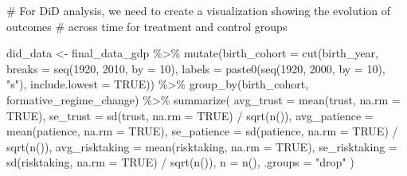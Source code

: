 \documentclass[
  letterpaper,
  DIV=11,
  numbers=noendperiod]{scrartcl}
\newenvironment{Shaded}{\begin{snugshade}}{\end{snugshade}}
\newcommand{\AttributeTok}[1]{\textcolor[rgb]{0.40,0.45,0.13}{#1}}
\newcommand{\CommentTok}[1]{\textcolor[rgb]{0.37,0.37,0.37}{#1}}
\newcommand{\ConstantTok}[1]{\textcolor[rgb]{0.56,0.35,0.01}{#1}}
\newcommand{\DecValTok}[1]{\textcolor[rgb]{0.68,0.00,0.00}{#1}}
\newcommand{\FunctionTok}[1]{\textcolor[rgb]{0.28,0.35,0.67}{#1}}
\newcommand{\NormalTok}[1]{\textcolor[rgb]{0.00,0.23,0.31}{#1}}
\newcommand{\OtherTok}[1]{\textcolor[rgb]{0.00,0.23,0.31}{#1}}
\newcommand{\SpecialCharTok}[1]{\textcolor[rgb]{0.37,0.37,0.37}{#1}}
\newcommand{\StringTok}[1]{\textcolor[rgb]{0.13,0.47,0.30}{#1}}
\begin{document}
\begin{Shaded}
\begin{Highlighting}[]
\CommentTok{\# For DiD analysis, we need to create a visualization showing the evolution of outcomes}
\CommentTok{\# across time for treatment and control groups}

\NormalTok{did\_data }\OtherTok{\textless{}{-}}\NormalTok{ final\_data\_gdp }\SpecialCharTok{\%\textgreater{}\%}
  \FunctionTok{mutate}\NormalTok{(}\AttributeTok{birth\_cohort =} \FunctionTok{cut}\NormalTok{(birth\_year, }
                          \AttributeTok{breaks =} \FunctionTok{seq}\NormalTok{(}\DecValTok{1920}\NormalTok{, }\DecValTok{2010}\NormalTok{, }\AttributeTok{by =} \DecValTok{10}\NormalTok{),}
                          \AttributeTok{labels =} \FunctionTok{paste0}\NormalTok{(}\FunctionTok{seq}\NormalTok{(}\DecValTok{1920}\NormalTok{, }\DecValTok{2000}\NormalTok{, }\AttributeTok{by =} \DecValTok{10}\NormalTok{), }\StringTok{"s"}\NormalTok{),}
                          \AttributeTok{include.lowest =} \ConstantTok{TRUE}\NormalTok{)) }\SpecialCharTok{\%\textgreater{}\%}
  \FunctionTok{group\_by}\NormalTok{(birth\_cohort, formative\_regime\_change) }\SpecialCharTok{\%\textgreater{}\%}
  \FunctionTok{summarize}\NormalTok{(}
    \AttributeTok{avg\_trust =} \FunctionTok{mean}\NormalTok{(trust, }\AttributeTok{na.rm =} \ConstantTok{TRUE}\NormalTok{),}
    \AttributeTok{se\_trust =} \FunctionTok{sd}\NormalTok{(trust, }\AttributeTok{na.rm =} \ConstantTok{TRUE}\NormalTok{) }\SpecialCharTok{/} \FunctionTok{sqrt}\NormalTok{(}\FunctionTok{n}\NormalTok{()),}
    \AttributeTok{avg\_patience =} \FunctionTok{mean}\NormalTok{(patience, }\AttributeTok{na.rm =} \ConstantTok{TRUE}\NormalTok{),}
    \AttributeTok{se\_patience =} \FunctionTok{sd}\NormalTok{(patience, }\AttributeTok{na.rm =} \ConstantTok{TRUE}\NormalTok{) }\SpecialCharTok{/} \FunctionTok{sqrt}\NormalTok{(}\FunctionTok{n}\NormalTok{()),}
    \AttributeTok{avg\_risktaking =} \FunctionTok{mean}\NormalTok{(risktaking, }\AttributeTok{na.rm =} \ConstantTok{TRUE}\NormalTok{),}
    \AttributeTok{se\_risktaking =} \FunctionTok{sd}\NormalTok{(risktaking, }\AttributeTok{na.rm =} \ConstantTok{TRUE}\NormalTok{) }\SpecialCharTok{/} \FunctionTok{sqrt}\NormalTok{(}\FunctionTok{n}\NormalTok{()),}
    \AttributeTok{n =} \FunctionTok{n}\NormalTok{(),}
    \AttributeTok{.groups =} \StringTok{"drop"}
\NormalTok{  )}


\end{Highlighting}
\end{Shaded}
\end{document}
